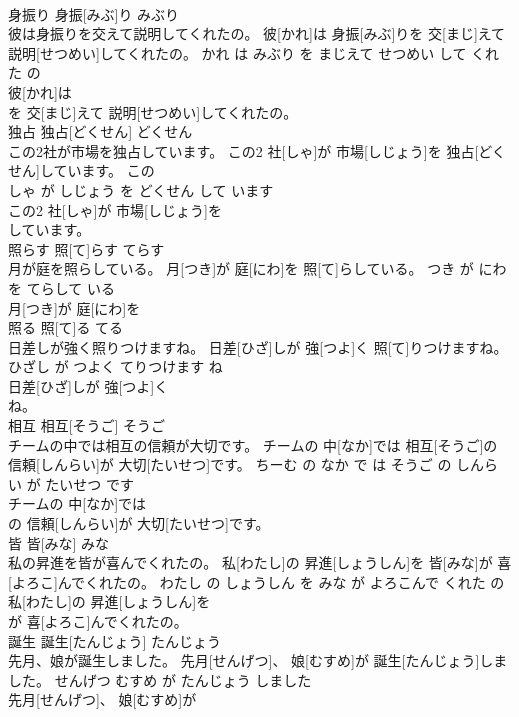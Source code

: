 \documentclass[8pt]{extreport}
\begin{document}
\begin{CJK}{UTF8}{min}
\\	身振り	身振[みぶ]り	みぶり	
\\	彼は身振りを交えて説明してくれたの。	彼[かれ]は 身振[みぶ]りを 交[まじ]えて 説明[せつめい]してくれたの。	かれ は みぶり を まじえて せつめい して くれた の	
\\	彼[かれ]は
\\	を 交[まじ]えて 説明[せつめい]してくれたの。			
\\	独占	独占[どくせん]	どくせん	
\\	この2社が市場を独占しています。	この2 社[しゃ]が 市場[しじょう]を 独占[どくせん]しています。	この 
\\	しゃ が しじょう を どくせん して います	
\\	この2 社[しゃ]が 市場[しじょう]を
\\	しています。			
\\	照らす	照[て]らす	てらす	
\\	月が庭を照らしている。	月[つき]が 庭[にわ]を 照[て]らしている。	つき が にわ を てらして いる	
\\	月[つき]が 庭[にわ]を
\\	照る	照[て]る	てる	
\\	日差しが強く照りつけますね。	日差[ひざ]しが 強[つよ]く 照[て]りつけますね。	ひざし が つよく てりつけます ね	
\\	日差[ひざ]しが 強[つよ]く
\\	ね。			
\\	相互	相互[そうご]	そうご	
\\	チームの中では相互の信頼が大切です。	チームの 中[なか]では 相互[そうご]の 信頼[しんらい]が 大切[たいせつ]です。	ちーむ の なか で は そうご の しんらい が たいせつ です	
\\	チームの 中[なか]では
\\	の 信頼[しんらい]が 大切[たいせつ]です。			
\\	皆	皆[みな]	みな	
\\	私の昇進を皆が喜んでくれたの。	私[わたし]の 昇進[しょうしん]を 皆[みな]が 喜[よろこ]んでくれたの。	わたし の しょうしん を みな が よろこんで くれた の	
\\	私[わたし]の 昇進[しょうしん]を
\\	が 喜[よろこ]んでくれたの。			
\\	誕生	誕生[たんじょう]	たんじょう	
\\	先月、娘が誕生しました。	先月[せんげつ]、 娘[むすめ]が 誕生[たんじょう]しました。	せんげつ むすめ が たんじょう しました	
\\	先月[せんげつ]、 娘[むすめ]が

\end{CJK}
\end{document}
